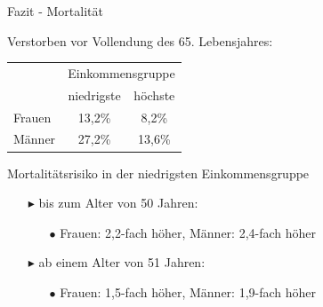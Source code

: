 \documentclass{beamer}
\begin{document}
\begin{frame}{Fazit - Mortalität}
	\begin{block}{Verstorben vor Vollendung des 65. Lebensjahres:}	
\hspace{3cm}		
		\begin{tabular}{lcc}
			\toprule
			 & \multicolumn{2}{c}{Einkommensgruppe}\\
			 & niedrigste  & höchste \\
			\midrule
			Frauen & 13,2\%  & 8,2\% \\
			Männer & 27,2\%  & 13,6\%  \\
		\bottomrule	
		\end{tabular}
	\end{block}
	\pause
	\begin{block}{Mortalitätsrisiko in der niedrigsten Einkommensgruppe}
		\begin{itemize}
			\item[$\blacktriangleright$] bis zum Alter von 50 Jahren:
			\begin{itemize}
				\item[$\bullet$] Frauen: 2,2-fach höher, Männer: 2,4-fach höher
			\end{itemize}
			\item[$\blacktriangleright$] ab einem Alter von 51 Jahren:
			\begin{itemize}
				\item[$\bullet$] Frauen: 1,5-fach höher, Männer: 1,9-fach höher 
			\end{itemize}
		\end{itemize}
	\end{block}
\end{frame}
\end{document}
